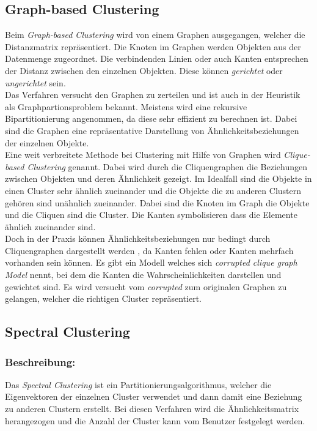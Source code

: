 \subsection{Graph-based Clustering}
Beim \textit{Graph-based Clustering} wird von einem Graphen ausgegangen, welcher die Distanzmatrix repräsentiert. Die Knoten im Graphen werden Objekten aus der Datenmenge zugeordnet. Die verbindenden Linien oder auch Kanten entsprechen der Distanz zwischen den einzelnen Objekten. Diese können \textit{gerichtet} oder \textit{ungerichtet} sein.\cite{fasulo99,jain99} \\
Das Verfahren versucht den Graphen zu zerteilen und ist auch in der Heuristik als Graphpartionsproblem bekannt. Meistens wird eine rekursive Bipartitionierung angenommen, da diese sehr effizient zu berechnen ist. Dabei sind die Graphen eine repräsentative Darstellung von Ähnlichkeitsbeziehungen der einzelnen Objekte.\cite{jain99}\\
Eine weit verbreitete Methode bei Clustering mit Hilfe von Graphen wird \textit{Clique-based Clustering} genannt. Dabei wird durch die Cliquengraphen die Beziehungen zwischen Objekten und deren Ähnlichkeit gezeigt. Im Idealfall sind die Objekte in einen Cluster sehr ähnlich zueinander und die Objekte die zu anderen Clustern gehören sind unähnlich zueinander. Dabei sind die Knoten im Graph die Objekte und die Cliquen sind die Cluster. Die Kanten symbolisieren dass die Elemente ähnlich zueinander sind.\cite{fasulo99,jain99}\\
Doch in der Praxis können Ähnlichkeitsbeziehungen nur bedingt durch Cliquengraphen dargestellt werden , da Kanten fehlen oder Kanten mehrfach vorhanden sein können. Es gibt ein Modell welches sich \textit{corrupted clique graph Model} nennt, bei dem die Kanten die Wahrscheinlichkeiten darstellen und gewichtet sind. Es wird versucht vom \textit{corrupted} zum originalen Graphen zu gelangen, welcher die richtigen Cluster repräsentiert.\\ \cite{fasulo99}

\subsection{Spectral Clustering} 
\subsubsection{Beschreibung:}
Das \textit{Spectral Clustering} ist ein Partitionierungsalgorithmus, welcher die Eigenvektoren der einzelnen Cluster verwendet und dann damit eine Beziehung zu anderen Clustern erstellt. Bei diesen Verfahren wird die Ähnlichkeitsmatrix herangezogen und die Anzahl der Cluster kann vom Benutzer festgelegt werden.
